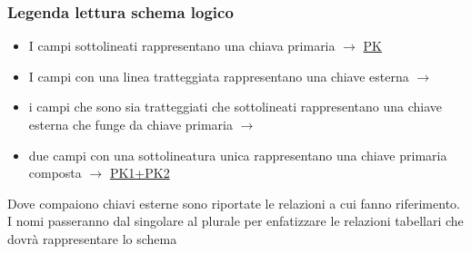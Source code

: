 \documentclass[a4paper,12pt]{report}
\begin{document}
\subsubsection*{Legen\-da let\-tura schema logico}
\begin{itemize}
	\item I campi sottolineati rappresentano una chiava primaria \(\rightarrow\) \underline{PK}
	\item I campi con una linea tratteggiata rappresentano una chiave esterna \(\rightarrow\) 
	\item i campi che sono sia tratteggiati che sottolineati rappresentano una chiave esterna che funge da chiave primaria \(\rightarrow\) \underline{}
	\item due campi con una sottolineatura unica rappresentano una chiave primaria composta \(\rightarrow\) \underline{PK1+PK2}
\end{itemize}
Dove comp\-aiono chiavi esterne sono ripor\-tate le relazioni a cui fan\-no ri\-ferimento.
I nomi passeranno dal singolare al plurale per enfatizzare le relazioni tabellari che dovrà rappresentare lo schema\\\\
\end{document}
